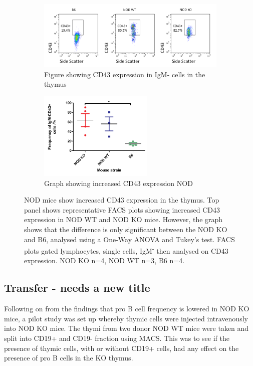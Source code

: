 \begin{figure}
	\begin{subfigure}{\textwidth}
	\includegraphics[width=\textwidth]{Figures/CD43expression.png}
	\caption{Figure showing CD43 expression in IgM- cells in the thymus}
	\end{subfigure}
	\begin{subfigure}{\textwidth}
	\centering
	\includegraphics[width=0.6\textwidth]{Figures/CD43levels.pdf}
	\caption{Graph showing increased CD43 expression NOD}
	\end{subfigure}
\caption{NOD mice show increased CD43 expression in the thymus.
Top panel shows representative FACS plots showing increased CD43 expression in NOD WT and NOD KO mice.
However, the graph shows that the difference is only significant between the NOD KO and B6, analysed using a One-Way ANOVA and Tukey's test.
FACS plots gated lymphocytes, single cells, IgM\textsuperscript{-} then analysed on CD43 expression.
NOD KO n=4, NOD WT n=3, B6 n=4. }
\label{fig:CD43expression}
\end{figure}


\subsection{Transfer - needs a new title}

Following on from the findings that pro B cell frequency is lowered in NOD KO mice, a pilot study was set up whereby thymic cells were injected intravenously into NOD KO mice.
The thymi from two donor NOD WT mice were taken and split into CD19+ and CD19- fraction using MACS.
This was to see if the presence of thymic cells, with or without CD19+ cells, had any effect on the presence of pro B cells in the KO thymus.

